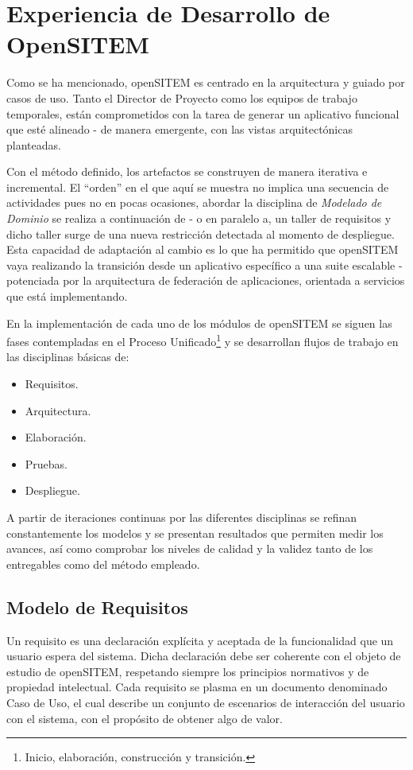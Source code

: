 \chapter{Experiencia de Desarrollo de OpenSITEM}

Como se ha mencionado, openSITEM es centrado en la arquitectura y guiado por casos de uso. Tanto el Director de Proyecto como los equipos de trabajo temporales, están comprometidos con la tarea de generar un aplicativo funcional que esté alineado - de manera emergente, con las vistas arquitectónicas planteadas.

Con el método definido, los artefactos se construyen de manera iterativa e incremental. El ``orden'' en el que aquí se muestra no implica una secuencia de actividades pues no en pocas ocasiones, abordar la disciplina de \textit{Modelado de Dominio} se realiza a continuación de - o en paralelo a, un taller de requisitos y dicho taller surge de una nueva restricción detectada al momento de despliegue. Esta capacidad de adaptación al cambio es lo que ha permitido que openSITEM vaya realizando la transición desde un aplicativo específico a una suite escalable - potenciada por la arquitectura de federación de aplicaciones, orientada a servicios que está implementando.

En la implementación de cada uno de los módulos de openSITEM se siguen las fases contempladas en el Proceso Unificado\footnote{Inicio, elaboración, construcción y transición.} y se desarrollan flujos de trabajo en las disciplinas básicas de:

\begin{itemize}
\item Requisitos.
\item Arquitectura.
\item Elaboración.
\item Pruebas.
\item Despliegue.
\end{itemize}

A partir de iteraciones continuas por las diferentes disciplinas se refinan constantemente los modelos y se presentan resultados que permiten medir los avances, así como comprobar los niveles de calidad y la validez tanto de los entregables como del método empleado. 

\section{Modelo de Requisitos}

Un requisito es una declaración explícita y aceptada de la funcionalidad que un usuario espera del sistema. Dicha declaración debe ser coherente con el objeto de estudio de openSITEM, respetando siempre los principios normativos y de propiedad intelectual. Cada requisito se plasma en un documento denominado Caso de Uso, el cual describe un conjunto de escenarios de interacción del usuario con el sistema, con el propósito de obtener algo de valor.

